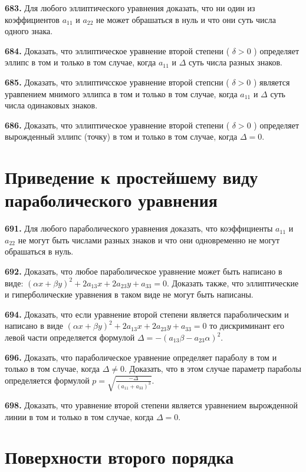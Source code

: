 \textbf{683.} Для любого эллиптического уравнения доказать, что ни один из коэффициентов $a_{11}$ и $a_{22}$ не может обрашаться в нуль и что они суть числа одного знака.

\textbf{684.} Доказать, что эллиптическое уравнение второй степени ( $\delta>0$ ) определяет эллипс в том и только в том случае, когда $a_{11}$ и $\Delta$ суть числа разных знаков.

\textbf{685.} Доказать, что эллиптичсское уравнение второй степсни ( $\delta>0$ ) является уравпением мнимого эллипса в том и только в том случае, когда $a_{11}$ и $\Delta$ суть числа одинаковых знаков.

\textbf{686.} Доказать, что эллиптическое уравнение второй степени ( $\delta>0$ ) определяет вырожденный эллипс (точку) в том и только в том случае, когда $\Delta=0$.



\section{Приведение к простейшему виду параболического уравнения}



\textbf{691.} Для любого параболического уравнения доказать, что коэффициенты $a_{11}$ и $a_{22}$ не могут быть числами разных знаков и что они одновременно не могут обрашаться в нуль.

\textbf{692.} Доказать, что любое параболическое уравнение может быть написано в виде: $ (\alpha x+\beta y) ^2+2a_{13}x+2a_{23}y+a_{33}=0$. Доказать также, что эллиптические и гиперболические уравнения в таком виде не могут быть написаны.

\textbf{694.} Доказать, что если уравнение второй степени является параболическим и написано в виде $ (\alpha x+\beta y) ^2+2a_{13}x+2a_{23}y+a_{33}=0$ то дискриминант его левой части определяется формулой $\Delta=- (a_{13} \beta-a_{23} \alpha) ^2$.

\textbf{696.} Доказать, что параболическое уравнение определяет параболу в том и только в том случае, когда $\Delta \neq 0$. Доказать, что в этом случае параметр параболы определяется формулой $p=\sqrt{\frac{-\Delta}{ (a_{11}+a_{33}) ^3}}$.

\textbf{698.} Доказать, что уравнение второй степени является уравнением вырожденной линии в том и только в том случае, когда $\Delta=0$.



\section{Поверхности второго порядка}



